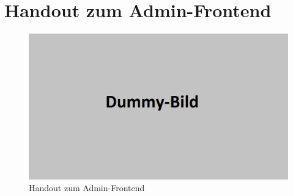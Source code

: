 \section{Handout zum Admin-Frontend}
\label{sec: Handout zum Admin-Frontend}


\begin{figure}[H]
	\begin{center}
	\includegraphics[width=0.65 \textwidth]{./Bilder/dummy.png}
	\end{center}
	\caption{Handout zum Admin-Frontend}
	\label{pic: Handout zum Admin-Frontend}
\end{figure}

